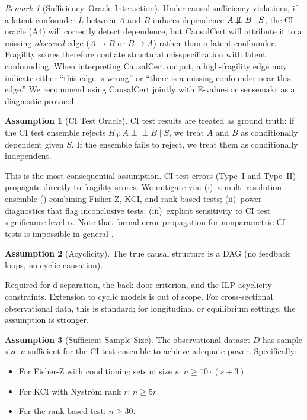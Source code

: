 \documentclass[11pt,a4paper]{article}
\theoremstyle{definition}
\newtheorem{assumption}{Assumption}
\theoremstyle{remark}
\newtheorem{remark}[theorem]{Remark}
\newcommand{\CI}{\perp\!\!\!\perp}
\newcommand{\NCI}{\not\!\perp\!\!\!\perp}
\begin{document}
\begin{remark}[Sufficiency--Oracle Interaction]\label{rem:sufficiency_oracle}
Under causal sufficiency violations, if a latent confounder $L$ between $A$ and $B$
induces dependence $A \NCI B \mid S$, the CI oracle (A4) will correctly detect
dependence, but CausalCert will attribute it to a missing \emph{observed} edge
($A \to B$ or $B \to A$) rather than a latent confounder. Fragility scores therefore
conflate structural misspecification with latent confounding. When interpreting
CausalCert output, a high-fragility edge may indicate either ``this edge is wrong''
or ``there is a missing confounder near this edge.'' We recommend using CausalCert
jointly with E-values or sensemakr as a diagnostic protocol.
\end{remark}

\begin{assumption}[CI Test Oracle]\label{asm:oracle}
CI test results are treated as ground truth: if the CI test ensemble rejects
$H_0\!: A \CI B \mid S$, we treat $A$ and $B$ as conditionally dependent given $S$.
If the ensemble fails to reject, we treat them as conditionally independent.
\end{assumption}

This is the most consequential assumption. CI test errors (Type~I and Type~II)
propagate directly to fragility scores. We mitigate via: (i)~a multi-resolution ensemble
() combining Fisher-Z, KCI, and rank-based tests; (ii)~power
diagnostics that flag inconclusive tests; (iii)~explicit sensitivity to CI test
significance level $\alpha$. Note that formal error propagation for nonparametric CI
tests is impossible in general \cite{shah2020}.

\begin{assumption}[Acyclicity]\label{asm:acyclic}
The true causal structure is a DAG (no feedback loops, no cyclic causation).
\end{assumption}

Required for d-separation, the back-door criterion, and the ILP acyclicity constraints.
Extension to cyclic models is out of scope. For cross-sectional observational data, this
is standard; for longitudinal or equilibrium settings, the assumption is stronger.

\begin{assumption}[Sufficient Sample Size]\label{asm:sample}
The observational dataset $D$ has sample size $n$ sufficient for the CI test ensemble to
achieve adequate power. Specifically:
\begin{itemize}
  \item For Fisher-Z with conditioning sets of size $s$: $n \geq 10 \cdot (s + 3)$.
  \item For KCI with Nystr\"om rank $r$: $n \geq 5r$.
  \item For the rank-based test: $n \geq 30$.
\end{itemize}
\end{assumption}
\end{document}
